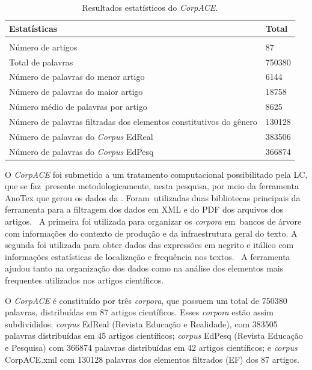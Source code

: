 \documentclass[portuguese]{textolivre}
\begin{document}
\begin{table}[htbp]
\begin{center}
\caption{Resultados estatísticos do \textit{CorpACE}.}
\label{tbl03}
\begin{tabular}{ll}
 \toprule 
\textbf{Estatísticas}         &        \textbf{Total} \\ \hline                          \\
Número de artigos         &         87                              \\
Total de palavras   &                 750380                          \\
Número de palavras do menor artigo    &  6144                            \\
Número de palavras do maior artigo  &     18758                           \\
Número médio de palavras por artigo          &         8625               \\
Número de palavras filtradas dos elementos constitutivos do gênero    &   130128 \\
Número de palavras do \textit{Corpus} EdReal     &  383506                             \\
Número de palavras do \textit{Corpus} EdPesq   &     366874                            \\ \hline 
\end{tabular}
\end{center}
\end{table}

O \textit{CorpACE} foi submetido a um tratamento computacional possibilitado pela LC, que se faz presente metodologicamente, nesta pesquisa, por meio da ferramenta AnoTex que gerou os dados da . Foram utilizadas duas bibliotecas principais da ferramenta para a filtragem dos dados em XML e do PDF dos arquivos dos artigos.  A primeira foi utilizada para organizar os \textit{corpora} em bancos de árvore com informações do contexto de produção e da infraestrutura geral do texto. A segunda foi utilizada para obter dados das expressões em negrito e itálico com informações estatísticas de localização e frequência nos textos.  A ferramenta ajudou tanto na organização dos dados como na análise dos elementos mais frequentes utilizados nos artigos científicos.

O \textit{CorpACE} é constituído por três \textit{corpora}, que possuem um total de 750380 palavras, distribuídas em 87 artigos científicos. Esses \textit{corpora} estão assim subdivididos: \textit{corpus} EdReal (Revista Educação e Realidade), com 383505 palavras distribuídas em 45 artigos científicos; \textit{corpus} EdPesq (Revista Educação e Pesquisa) com 366874 palavras distribuídas em 42 artigos científicos; e \textit{corpus} CorpACE.xml com 130128 palavras dos elementos filtrados (EF) dos 87 artigos.
\end{document}
